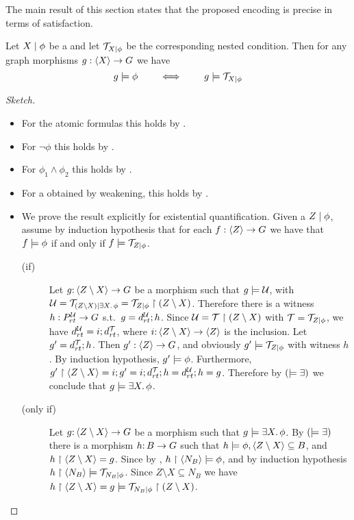 The main result of this section states that the proposed encoding is precise in terms of satisfaction. 
\begin{proposition}
	Let ${X} \mid {\phi}$ be a {\cfor} and let ${\mathcal{T}}_{{X} \mid {\phi}}$ be the corresponding nested condition. Then for any graph morphisms $g: \langle X\rangle \rightarrow G$ we have
	$$ g \models \phi \qquad \iff \qquad g \models {\mathcal{T}}_{{X} \mid {\phi}} $$
\end{proposition}
\begin{proof}[Sketch]
	\begin{itemize}
	\item For the atomic formulas this holds by .
	\item For $\neg \phi$ this holds by .
	
	\item For $\phi_1 \wedge \phi_2$ this holds by .
	\item For a {\cfor} obtained by weakening, this holds by .
	\item We prove the result explicitly for existential quantification. Given a \cfor ${Z} \mid {\phi}$, assume by induction hypothesis that for each $f: \langle Z\rangle \rightarrow G$ we have that  $f \models \phi$ if and only if $f \models {\mathcal{T}}_{{Z} \mid {\phi}}$.
	\begin{description}
		\item[(if)] 
	Let $g{:}\, \langle Z\setminus X\rangle \rightarrow G$ be a morphism such that $g \models {\mathcal{U}}$, with ${\mathcal{U}} = {\mathcal{T}}_{{(Z \setminus X)} \mid {\exists X.\,\phi}} = {\mathcal{T}}_{{Z} \mid {\phi}} \restriction (Z\setminus X)$. Therefore there is a witness $h: P^{{\mathcal{U}}}_{rt} \rightarrow G$ s.t.~$g = d^{{\mathcal{U}}}_{rt}; h$. Since ${\mathcal{U}} = {\mathcal{T}} \restriction (Z\setminus X)$ with ${\mathcal{T}} = {\mathcal{T}}_{{Z} \mid {\phi}}$, we have $d^{{\mathcal{U}}}_{rt} = i; d^{{\mathcal{T}}}_{rt}$, where $i{:}\, \langle Z\setminus X\rangle \rightarrow \langle Z\rangle$ is the inclusion. Let $g' = d^{{\mathcal{T}}}_{rt}; h$. Then $g': \langle Z\rangle \rightarrow G$, and obviously $g' \models {\mathcal{T}}_{{Z} \mid {\phi}}$ with witness $h$. By induction hypothesis, $g' \models \phi$. Furthermore, $g'\restriction \langle Z\setminus X\rangle = i;g' = i;d^{{\mathcal{T}}}_{rt}; h = d^{{\mathcal{U}}}_{rt}; h = g$. Therefore by $(\models \exists)$ we conclude that $g \models \exists X.\,\phi$.   
	
	\item[(only if)] Let $g{:}\, \langle Z\setminus X\rangle \rightarrow G$ be a morphism such that $g \models \exists X.\,\phi$. By $(\models \exists)$  there is a morphism $h{:}\, B \rightarrow G$ such that $h \models \phi, \langle Z\setminus X\rangle \subseteq B$, and $h\restriction \langle Z\setminus X\rangle = g$. Since by ,  $h\restriction \langle N_B\rangle \models \phi$, and by induction hypothesis   $h\restriction \langle N_B\rangle \models {\mathcal{T}}_{{N_B} \mid {\phi}}$. Since  $Z \setminus X \subseteq N_B$ we have $h\restriction \langle Z \setminus X\rangle = g \models  {\mathcal{T}}_{{N_B} \mid {\phi}}\restriction (Z \setminus X)$.
\end{description} 
\end{itemize}


\end{proof}

